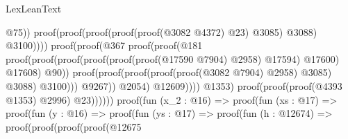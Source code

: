\begin{lexlean}{LexLeanText}
\begin{coremodule}
                                                                          @75))
                                                                    proof(proof(proof(proof(proof(@3082
                                                                                @4372)
                                                                              @23)
                                                                            @3085)
                                                                          @3088)
                                                                        @3100))))
                                                            proof(proof(@367
                                                                  proof(proof(@181
                                                                        proof(proof(proof(proof(proof(proof(@17590
                                                                                      @7904)
                                                                                    @2958)
                                                                                  @17594)
                                                                                @17600)
                                                                              @17608)
                                                                            @90))
                                                                      proof(proof(proof(proof(proof(@3082
                                                                                  @7904)
                                                                                @2958)
                                                                              @3085)
                                                                            @3088)
                                                                          @3100)))
                                                                @9267))
                                                          @2054)
                                                        @12609))))
                                              @1353)
                                            proof(proof(proof(@4393 @1353) @2996) @23))))))
                                proof(fun (x_2 : @16) =>
                                  proof(fun (xs : @17) =>
                                    proof(fun (y : @16) =>
                                      proof(fun (ys : @17) =>
                                        proof(fun (h : @12674) =>
                                          proof(proof(proof(proof(@12675

\end{coremodule}
\end{lexlean}
